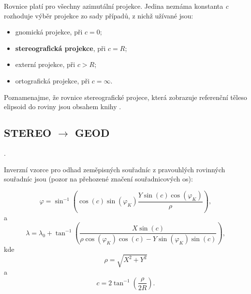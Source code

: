 \documentclass[11pt,a4paper]{article}
\begin{document}
Rovnice platí pro všechny azimutální projekce. Jedina neznáma konstanta \textit{c} rozhoduje výběr projekce zo sady případů, z nichž užívané jsou:
\begin{itemize}
\item gnomická projekce, při $c = 0$;
\item {\textbf{stereografická projekce}}, při $c = R$;
\item externí projekce, při $c > R$;
\item ortografická projekce, při $c = \infty$.
\end{itemize} 

Poznamenajme, že rovnice stereografické projece, která zobrazuje referenční těleso elipsoid do roviny jsou obsahem knihy \cite{Snyder1987}.

\subsection{STEREO $\rightarrow$ GEOD}.

Inverzní vzorce pro odhad zeměpisných souřadníc z pravouhlých rovinných souřadníc jsou \cite{stereoWolf} (pozor na přehozené značení souřadnicových os):

\begin{equation}
\varphi = \sin^{-1}{\left(\cos{\left(c\right)}\sin{\left(\varphi_{K}\right)}\dfrac{Y\sin{\left(c\right)}\cos{\left(\varphi_{K}\right)}}{\rho}\right)},
\end{equation}
a
\begin{equation}
\lambda = \lambda_{0} +  \tan^{-1}{\left(\dfrac{X\sin{\left(c\right)}}{\rho\cos{\left(\varphi_{K}\right)}\cos{\left(c\right)}-Y\sin{\left(\varphi_{K}\right)}\sin{\left(c\right)}}\right)},
\end{equation}
kde
\begin{equation}
\rho = \sqrt{X^{2} + Y^{2}}
\end{equation}
a
\begin{equation}
c = 2\tan^{-1}{\left(\dfrac{\rho}{2R}\right)}.
\end{equation}






















 
\end{document}
